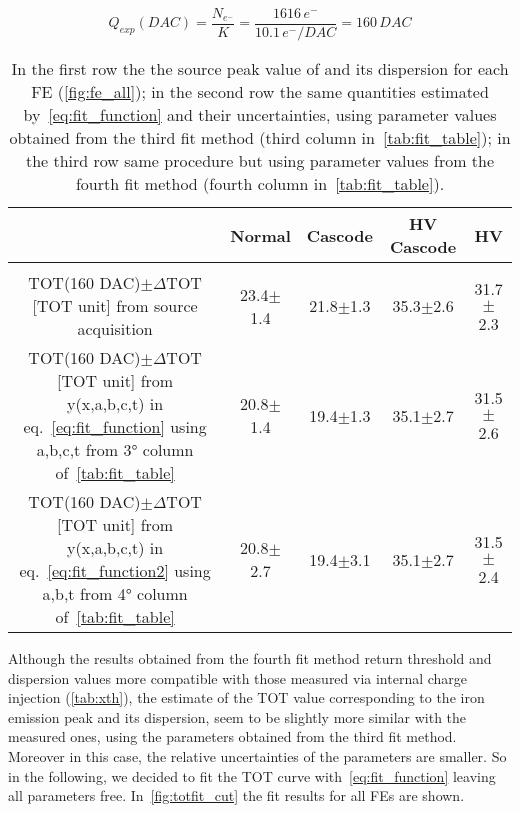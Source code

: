 \begin{equation}
Q_{exp}(DAC) = \frac{N_{e^{-}}}{K} = \frac{1616 \, e^{-}}{10.1 \, e^{-}/DAC} = 160 \, DAC    
\end{equation}

\begin{table}[h!]
\centering
\begin{tabular}{c|c|c|c|c}
 & \textbf{Normal} & \textbf{Cascode} & \textbf{HV Cascode} & \textbf{HV} \\[.5ex]
\hline
\hline \\[-2.5ex]
\shortstack{TOT(160 DAC)$\pm\Delta$TOT [TOT unit] \\ from source acquisition} & 23.4$\pm$1.4 & 21.8$\pm$1.3 & 35.3$\pm$2.6 & 31.7$\pm$2.3 \\ [0.5ex]
\hline
\shortstack{TOT(160 DAC)$\pm\Delta$TOT [TOT unit] \\ from y(x,a,b,c,t) in eq.~\ref{eq:fit_function}\\ using a,b,c,t from 3° column of~\autoref{tab:fit_table}} & 20.8$\pm$1.4 & 19.4$\pm$1.3 & 35.1$\pm$2.7 & 31.5$\pm$2.6 \\[0.5ex]
\hline
\hline
\shortstack{TOT(160 DAC)$\pm\Delta$TOT [TOT unit] \\ from y(x,a,b,c,t) in eq.~\ref{eq:fit_function2}\\ using a,b,t from 4° column of~\autoref{tab:fit_table}} & 20.8$\pm$2.7 & 19.4$\pm$3.1 & 35.1$\pm$2.7 & 31.5$\pm$2.4 \\[0.5ex]
\hline
\hline
\end{tabular}
\caption{In the first row the the source peak value of  and its dispersion for each FE (\autoref{fig:fe_all}); in the second row the same quantities estimated by~\autoref{eq:fit_function} and their uncertainties, using parameter values obtained from the third fit method (third column in~\autoref{tab:fit_table}); in the third row same procedure but using parameter values from the fourth fit method (fourth column in~\autoref{tab:fit_table}).}
\label{tab:tot_fe}
\end{table}

Although the results obtained from the fourth fit method return threshold and dispersion values more compatible with those measured via internal charge injection (\autoref{tab:xth}), the estimate of the TOT value corresponding to the iron emission peak and its dispersion, seem to be slightly more similar with the measured ones, using the parameters obtained from the third fit method. Moreover in this case, the relative uncertainties of the parameters are smaller. So in the following, we decided to fit the TOT curve with~\autoref{eq:fit_function} leaving all parameters free. In~\autoref{fig:totfit_cut} the fit results for all FEs are shown.


